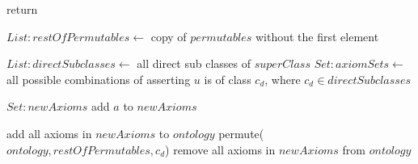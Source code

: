 \documentclass{article}
\begin{document}
\begin{algorithm}
\begin{algorithmic}[0]
    \State return
    \State
    \EndIf



    \State $List:restOfPermutables \leftarrow$ copy of $permutables$ without the first element

	\State $List:directSubclasses \leftarrow$ all direct sub classes of $superClass$
	\State $Set:axiomSets \leftarrow$ all possible combinations of asserting $u$ is of class $c_d$, where $c_d \in directSubclasses$
    \State

        \State $Set:newAxioms$
        \State
                \State add $a$ to $newAxioms$
            \EndIf
        \EndFor
        \State

            \State add all axioms in $newAxioms$ to $ontology$
            \State permute($ontology, restOfPermutables, c_d$)
            \State remove all axioms in $newAxioms$ from $ontology$
        \EndFor
    \EndFor






	
\EndProcedure
\end{algorithmic}
\end{algorithm}
\end{document}

